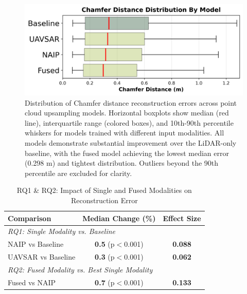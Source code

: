 \documentclass[remotesensing,article,submit,pdftex,moreauthors]{Definitions/mdpi}
\begin{document}
\begin{figure}
    \centering
    \includegraphics[width=0.75\linewidth]{manuscript/figures/boxplot_by_model.png}
    \caption{Distribution of Chamfer distance reconstruction errors across point cloud upsampling models. Horizontal boxplots show median (red line), interquartile range (colored boxes), and 10th-90th percentile whiskers for models trained with different input modalities. All models demonstrate substantial improvement over the LiDAR-only baseline, with the fused model achieving the lowest median error (0.298 m) and tightest distribution. Outliers beyond the 90th percentile are excluded for clarity.}
    \label{fig:boxplot_model_comparison}
\end{figure}





\begin{table}[htbp]
\centering
\caption{RQ1 \& RQ2: Impact of Single and Fused Modalities on Reconstruction Error}
\label{tab:rq1_rq2_combined}
\begin{tabular}{lcc}
\toprule
\textbf{Comparison} & \textbf{Median Change (\%)} & \textbf{Effect Size} \\
\midrule
\multicolumn{3}{l}{\textit{RQ1: Single Modality vs. Baseline}} \\
\quad NAIP vs Baseline & \textbf{0.5} (p$<$0.001) & \textbf{0.088} \\
\quad UAVSAR vs Baseline & \textbf{0.3} (p$<$0.001) & \textbf{0.062} \\
\midrule
\multicolumn{3}{l}{\textit{RQ2: Fused Modality vs. Best Single Modality}} \\
\quad Fused vs NAIP & \textbf{0.7} (p$<$0.001) & \textbf{0.133} \\
\bottomrule
\end{tabular}
\end{table}
\end{document}
